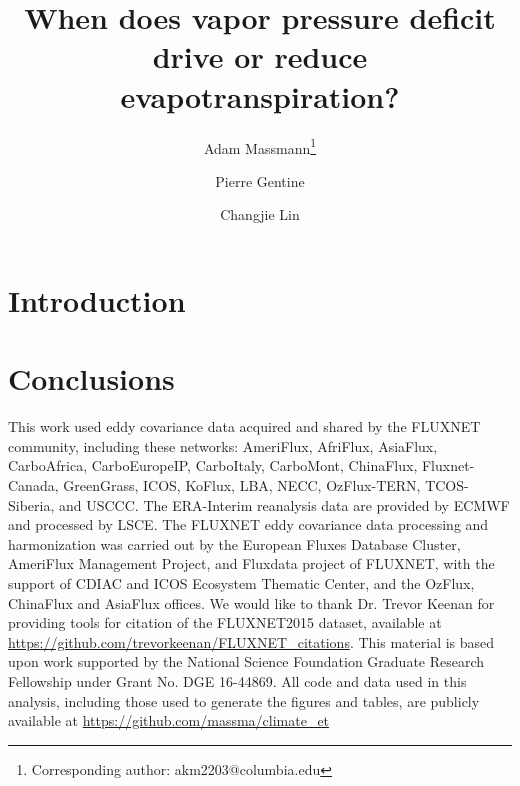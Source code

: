 \documentclass[12pt]{article}
\begin{document}
\title{When does vapor pressure deficit drive or reduce
  evapotranspiration?}

\author[1]{Adam Massmann\thanks{Corresponding author: akm2203@columbia.edu}}
\author[1]{Pierre Gentine}
\author[1,2]{Changjie Lin}


\maketitle
\begin{abstract}
  
\end{abstract}

\onehalfspacing

\section{Introduction}





\section{Conclusions}



\acknowledgments This work used eddy covariance data acquired and shared
by the FLUXNET community, including these networks: AmeriFlux, AfriFlux,
AsiaFlux, CarboAfrica, CarboEuropeIP, CarboItaly, CarboMont,
ChinaFlux, Fluxnet-Canada, GreenGrass, ICOS, KoFlux, LBA, NECC,
OzFlux-TERN, TCOS-Siberia, and USCCC. The ERA-Interim reanalysis data
are provided by ECMWF and processed by LSCE. The FLUXNET eddy covariance
data processing and harmonization was carried out by the European Fluxes
Database Cluster, AmeriFlux Management Project, and Fluxdata project of
FLUXNET, with the support of CDIAC and ICOS Ecosystem Thematic Center,
and the OzFlux, ChinaFlux and AsiaFlux offices. We would like to thank
Dr. Trevor Keenan for providing tools for citation of the FLUXNET2015
dataset, available at
\url{https://github.com/trevorkeenan/FLUXNET_citations}. This material is
based upon work supported by the National Science Foundation Graduate
Research Fellowship under Grant No. DGE 16-44869. All code and data used
in this analysis, including those used to generate the figures and
tables, are publicly available at \url{https://github.com/massma/climate\_et}
\end{document}
